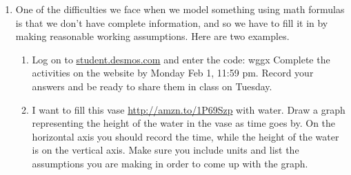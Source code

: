 \documentclass[11pt,dvipsnames]{article}
\begin{document}
\begin{enumerate}[label=$\blacktriangleright$ {\bf  \arabic*:}]
\item One of the difficulties we face when we model something using math formulas is that we don't have complete information, and so we have to fill it in by making reasonable working assumptions. Here are two examples.




\begin{enumerate}[label=$\blacktriangleright$ {\bf  \Alph*:}] 
	\item Log on to \url{student.desmos.com} and enter the code: wggx
	\smallskip Complete the activities on the website by Monday Feb 1, 11:59 pm. Record your answers and be ready to share them in class on Tuesday.
	\item I want to fill this vase \url{http://amzn.to/1P69Szp} with water. Draw a graph representing the height of the water in the vase as time goes by. On the horizontal axis you should record the time, while the height of the water is on the vertical axis. Make sure you include units and list the assumptions you are making in order to come up with the graph.
\end{enumerate}
\end{enumerate}	
\end{document}
